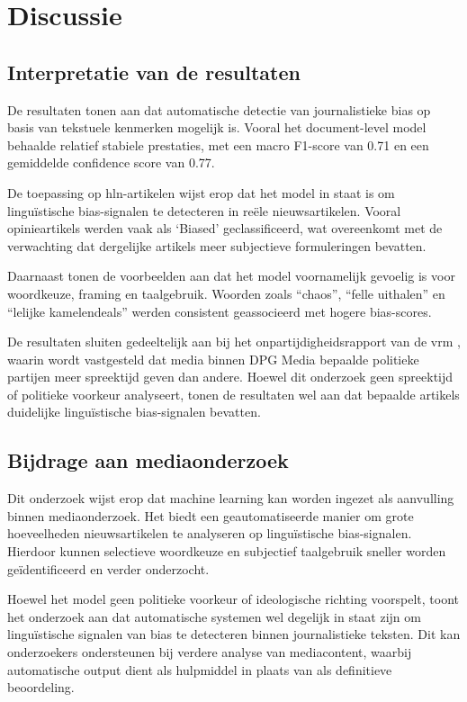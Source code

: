 \chapter{Discussie}
\label{ch:discussie}

\section{Interpretatie van de resultaten}

De resultaten tonen aan dat automatische detectie van journalistieke bias op basis van tekstuele kenmerken mogelijk is. Vooral het document-level model behaalde relatief stabiele prestaties, met een macro F1-score van 0.71 en een gemiddelde confidence score van 0.77.

De toepassing op \gls{hln}-artikelen wijst erop dat het model in staat is om linguïstische bias-signalen te detecteren in reële nieuwsartikelen. Vooral opinieartikels werden vaak als `Biased' geclassificeerd, wat overeenkomt met de verwachting dat dergelijke artikels meer subjectieve formuleringen bevatten.

Daarnaast tonen de voorbeelden aan dat het model voornamelijk gevoelig is voor woordkeuze, framing en taalgebruik. Woorden zoals ``chaos'', ``felle uithalen'' en ``lelijke kamelendeals'' werden consistent geassocieerd met hogere bias-scores.

De resultaten sluiten gedeeltelijk aan bij het onpartijdigheidsrapport van de \gls{vrm} \autocite{VanAelst2024}, waarin wordt vastgesteld dat media binnen DPG Media bepaalde politieke partijen meer spreektijd geven dan andere. Hoewel dit onderzoek geen spreektijd of politieke voorkeur analyseert, tonen de resultaten wel aan dat bepaalde artikels duidelijke linguïstische bias-signalen bevatten.

\section{Bijdrage aan mediaonderzoek}

Dit onderzoek wijst erop dat machine learning kan worden ingezet als aanvulling binnen mediaonderzoek. Het biedt een geautomatiseerde manier om grote hoeveelheden nieuwsartikelen te analyseren op linguïstische bias-signalen. Hierdoor kunnen selectieve woordkeuze en subjectief taalgebruik sneller worden geïdentificeerd en verder onderzocht.

Hoewel het model geen politieke voorkeur of ideologische richting voorspelt, toont het onderzoek aan dat automatische systemen wel degelijk in staat zijn om linguïstische signalen van bias te detecteren binnen journalistieke teksten. Dit kan onderzoekers ondersteunen bij verdere analyse van mediacontent, waarbij automatische output dient als hulpmiddel in plaats van als definitieve beoordeling.

